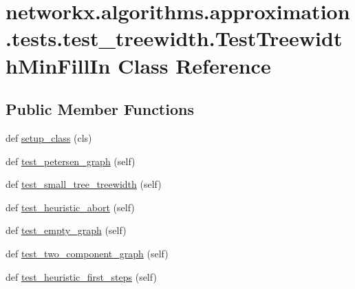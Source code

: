 \hypertarget{classnetworkx_1_1algorithms_1_1approximation_1_1tests_1_1test__treewidth_1_1TestTreewidthMinFillIn}{}\section{networkx.\+algorithms.\+approximation.\+tests.\+test\+\_\+treewidth.\+Test\+Treewidth\+Min\+Fill\+In Class Reference}
\label{classnetworkx_1_1algorithms_1_1approximation_1_1tests_1_1test__treewidth_1_1TestTreewidthMinFillIn}
\subsection*{Public Member Functions}
\begin{DoxyCompactItemize}
\item 
def \hyperlink{classnetworkx_1_1algorithms_1_1approximation_1_1tests_1_1test__treewidth_1_1TestTreewidthMinFillIn_a0755f58fcd7433ee35cf3a8b0fc74f11}{setup\+\_\+class} (cls)
\item 
def \hyperlink{classnetworkx_1_1algorithms_1_1approximation_1_1tests_1_1test__treewidth_1_1TestTreewidthMinFillIn_af3ef282c4bae9fa4e4f9abe6533c653c}{test\+\_\+petersen\+\_\+graph} (self)
\item 
def \hyperlink{classnetworkx_1_1algorithms_1_1approximation_1_1tests_1_1test__treewidth_1_1TestTreewidthMinFillIn_a78497c9f3e8e59ef5a1b3ef0625380c3}{test\+\_\+small\+\_\+tree\+\_\+treewidth} (self)
\item 
def \hyperlink{classnetworkx_1_1algorithms_1_1approximation_1_1tests_1_1test__treewidth_1_1TestTreewidthMinFillIn_a65dbc1c42caeb42f8bd83fbf7b57a537}{test\+\_\+heuristic\+\_\+abort} (self)
\item 
def \hyperlink{classnetworkx_1_1algorithms_1_1approximation_1_1tests_1_1test__treewidth_1_1TestTreewidthMinFillIn_aa4de80966c2f50c9f965a1212435c522}{test\+\_\+empty\+\_\+graph} (self)
\item 
def \hyperlink{classnetworkx_1_1algorithms_1_1approximation_1_1tests_1_1test__treewidth_1_1TestTreewidthMinFillIn_a52b5f1d5056ae6853a881c847b4adf3e}{test\+\_\+two\+\_\+component\+\_\+graph} (self)
\item 
def \hyperlink{classnetworkx_1_1algorithms_1_1approximation_1_1tests_1_1test__treewidth_1_1TestTreewidthMinFillIn_aba7500f6fad348ae7bda9b3fc528756d}{test\+\_\+heuristic\+\_\+first\+\_\+steps} (self)
\end{DoxyCompactItemize}
